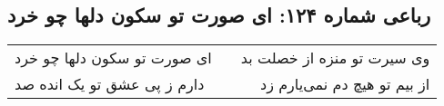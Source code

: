 \begin{center}
\section*{رباعی شماره ۱۲۴: ای صورت تو سکون دلها چو خرد}
\label{sec:sh124}
\begin{longtable}{l p{0.5cm} r}
ای صورت تو سکون دلها چو خرد
&&
وی سیرت تو منزه از خصلت بد
\\
دارم ز پی عشق تو یک انده صد
&&
از بیم تو هیچ دم نمی‌یارم زد
\\
\end{longtable}
\end{center}
